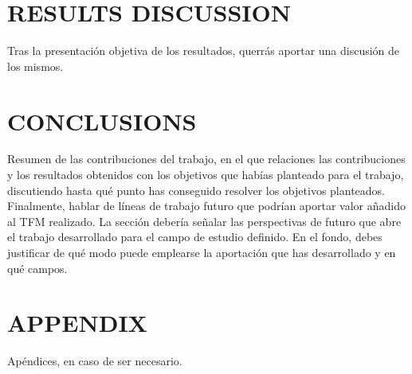 \documentclass[11pt,a4paper,USenglish,twocolumn]{article}
\begin{document}
\section{RESULTS DISCUSSION}

Tras la presentación objetiva de los resultados, querrás aportar una discusión de los mismos.

\section{CONCLUSIONS}

Resumen de las contribuciones del trabajo, en el que relaciones las contribuciones y los resultados obtenidos con los objetivos que habías planteado para el trabajo, discutiendo hasta qué punto has conseguido resolver los objetivos planteados.
Finalmente, hablar de líneas de trabajo futuro que podrían aportar valor añadido al TFM realizado. La sección debería señalar las perspectivas de futuro que abre el trabajo desarrollado para el campo de estudio definido. En el fondo, debes justificar de qué modo puede emplearse la aportación que has desarrollado y en qué campos.

\appendix
\section{APPENDIX}
Apéndices, en caso de ser necesario.

\renewcommand{\refname}{REFERENCES}


\end{document}
